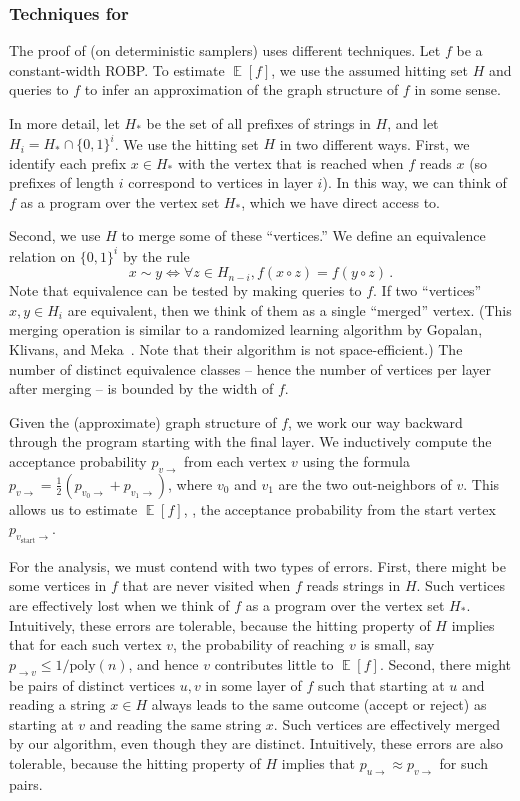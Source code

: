 \documentclass{toc}
\DeclareMathOperator*{\ExpVal}{\mathbb{E}}
\begin{document}
\subsubsection{Techniques for } \label{sec:const-width-techniques}
The proof of  (on deterministic samplers) uses different techniques. Let $f$ be a constant-width ROBP. To estimate $\ExpVal[f]$, we use the assumed hitting set $H$ and queries to $f$ to infer an approximation of the graph structure of $f$ in some sense.

In more detail, let $H_*$ be the set of all prefixes of strings in $H$, and let $H_i = H_* \cap \{0, 1\}^i$. We use the hitting set $H$ in two different ways. First, we identify each prefix $x \in H_*$ with the vertex that is reached when $f$ reads $x$ (so prefixes of length $i$ correspond to vertices in layer $i$). In this way, we can think of $f$ as a program over the vertex set $H_*$, which we have direct access to.

Second, we use $H$ to merge some of these ``vertices.'' We define an equivalence relation on $\{0, 1\}^i$ by the rule
\[
x \sim y \iff \forall z \in H_{n - i}, f(x \circ z) = f(y \circ z)\,.
\]
Note that equivalence can be tested by making queries to $f$. If two ``vertices'' $x, y \in H_i$ are equivalent, then we think of them as a single ``merged'' vertex. (This merging operation is similar to a randomized learning algorithm by Gopalan, Klivans, and Meka~\cite{GKM12}. Note that their algorithm is not space-efficient.) The number of distinct equivalence classes -- hence the number of vertices per layer after merging -- is bounded by %
the width of $f$. %

Given the (approximate) graph structure of $f$, we work our way backward through the program starting with the final layer. We inductively compute the acceptance probability $p_{v \to}$ from each vertex $v$ using the formula $p_{v \to} = \frac{1}{2} (p_{v_0 \to} + p_{v_1 \to})$, where $v_0$ and $v_1$ are the two out-neighbors of $v$. This allows us to estimate $\ExpVal[f]$, \ie, the acceptance probability from the start vertex $p_{v_{\text{start}} \to}$.

For the analysis, we must contend with two types of errors. First, there might be some vertices in $f$ that are never visited when $f$ reads strings in $H$. Such vertices are effectively lost when we think of $f$ as a program over the vertex set $H_*$. Intuitively, these errors are tolerable, because the hitting property of $H$ implies that for each such vertex $v$, the probability of reaching $v$ is small, say $p_{\to v} \leq 1/\text{poly}(n)$, and hence $v$ contributes little to $\ExpVal[f]$. Second, there might be pairs of distinct vertices $u, v$ in some layer of $f$ such that starting at $u$ and reading a string $x \in H$ always leads to the same outcome (accept or reject) as starting at $v$ and reading the same string $x$. Such vertices are effectively merged by our algorithm, even though they are distinct. Intuitively, these errors are also tolerable, because the hitting property of $H$ implies that $p_{u \to} \approx p_{v \to}$ for such pairs.
\end{document}
